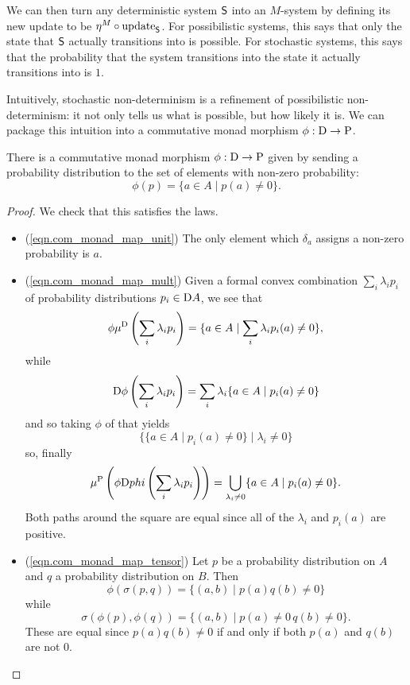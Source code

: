 \documentclass[DynamicalBook]{subfiles}
\begin{document}
We can then turn any deterministic system $\mathsf{S}$ into an $M$-system by
defining its new update to be $\eta^M \circ \mathrm{update}_{\mathsf{S}}$. For possibilistic
systems, this says that only the state that $\mathsf{S}$ actually transitions into
is possible. For stochastic systems, this says that the probability that the
system transitions into the state it actually transitions into is $1$.

Intuitively, stochastic non-determinism is a refinement of possibilistic
non-determinism: it not only tells us what is possible, but how likely it is. We
can package this intuition into a commutative monad morphism $\phi : \mathrm{D}
\to \mathrm{P}$.
\begin{proposition}
  There is a commutative monad morphism $\phi : \mathrm{D} \to \mathrm{P}$ given by
  sending a probability distribution to the set of elements with non-zero probability:
  \[
\phi(p) = \{a \in A \mid p(a) \neq 0\}.
  \]
\end{proposition}
\begin{proof}
  We check that this satisfies the laws.
  \begin{itemize}
    \item (\cref{eqn.com_monad_map_unit}) The only element which $\delta_a$
      assigns a non-zero probability is $a$.
    \item (\cref{eqn.com_monad_map_mult}) Given a formal convex combination
      $\sum_i \lambda_i p_i$ of probability distributions $p_i \in \mathrm{D} A$,
      we see that
      \[
\phi\mu^{\mathrm{D}}\left( \sum_{i}\lambda_i p_i \right) = \{a \in A \mid \sum_i
\lambda_i p_i(a) \neq 0\},
      \]
      while
      \[
\mathrm{D}\phi\left( \sum_i \lambda_i p_i \right) = \sum_{i} \lambda_i \{a \in A
\mid p_i(a) \neq 0\}
\]
and so taking $\phi$ of that yields
\[
\{\{a \in A \mid p_i(a) \neq 0\} \mid \lambda_i \neq 0\}
\]
so, finally
\[
\mu^{\mathrm{P}}\left( \phi \mathrm{D} phi\left( \sum_i \lambda_i p_i \right) \right)
= \bigcup_{\lambda_i \neq 0} \{a \in A \mid p_i(a) \neq 0\}.
\]
Both paths around the square are equal since all of the $\lambda_i$ and $p_i(a)$ are positive.
\item (\cref{eqn.com_monad_map_tensor}) Let $p$ be a probability distribution on
  $A$ and $q$ a probability distribution on $B$. Then
  \[
\phi(\sigma(p, q)) = \{(a, b) \mid p(a)q(b) \neq 0\}
\]
while
\[
\sigma(\phi(p), \phi(q)) = \{(a, b) \mid p(a) \neq 0\, q(b) \neq 0\}.
\]
These are equal since $p(a)q(b) \neq 0$ if and only if both $p(a)$ and $q(b)$
are not $0$.
  \end{itemize}
\end{proof}
\end{document}

